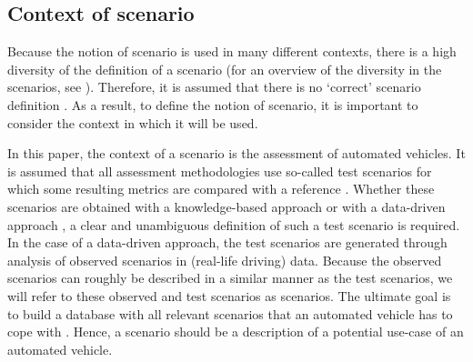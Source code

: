 \subsection{Context of scenario}
\label{sec:context}

Because the notion of scenario is used in many different contexts, there is a high diversity of the definition of a scenario (for an overview of the diversity in the scenarios, see \cite{vannotten2003updated, bishop2007scentechniques}). Therefore, it is assumed that there is no `correct' scenario definition \cite{vannotten2003updated}. As a result, to define the notion of scenario, it is important to consider the context in which it will be used.

In this paper, the context of a scenario is the assessment of automated vehicles. It is assumed that all assessment methodologies use so-called test scenarios for which some resulting metrics are compared with a reference \cite{stellet2015taxonomy}. Whether these scenarios are obtained with a knowledge-based approach \cite{gietelink2004systemvalidation, stellet2015taxonomy} or with a data-driven approach \cite{deGelder2017assessment, stellet2015taxonomy}, a clear and unambiguous definition of such a test scenario is required. In the case of a data-driven approach, the test scenarios are generated through analysis of observed scenarios in (real-life driving) data. Because the observed scenarios can roughly be described in a similar manner as the test scenarios, we will refer to these observed and test scenarios as scenarios.
The ultimate goal is to build a database with all relevant scenarios that an automated vehicle has to cope with \cite{putz2017pegasus}. Hence, a scenario should be a description of a potential use-case of an automated vehicle. 
